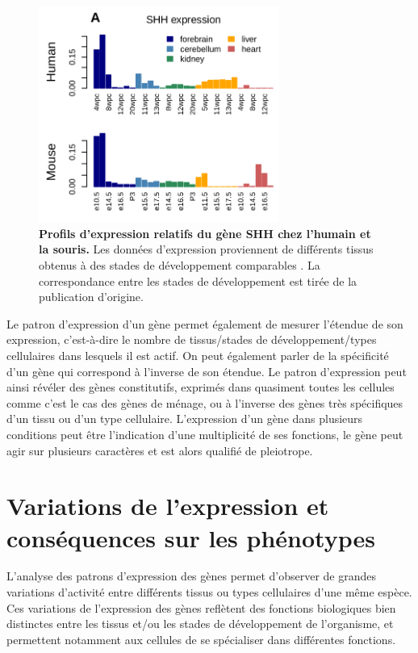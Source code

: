 \begin{figure}[h]
 \centering
 \includegraphics[width=0.7\textwidth, page=1] {figures/introduction/fig2.png}
 \caption[Profils d'expression relatifs du gène \acrshort{SHH} chez l'humain et la souris.]{
 \textbf{Profils d'expression relatifs du gène \acrshort{SHH} chez l'humain et la souris.}
 Les données d'expression proviennent de différents tissus obtenus à des stades de développement comparables \citep{cardoso-moreira_gene_2019}. La correspondance entre les stades de développement est tirée de la publication d'origine.\\
 }
 \label{fig:Fig2}
\end{figure} 

Le patron d’expression d’un gène permet également de mesurer l’étendue de son expression, c’est-à-dire le nombre de tissus/stades de développement/types cellulaires dans lesquels il est actif. On peut également parler de la spécificité d’un gène qui correspond à l’inverse de son étendue. Le patron d’expression peut ainsi révéler des gènes constitutifs, exprimés dans quasiment toutes les cellules comme c’est le cas des gènes de ménage, ou à l’inverse des gènes très spécifiques d’un tissu ou d'un type cellulaire. L’expression d’un gène dans plusieurs conditions peut être l’indication d’une multiplicité de ses fonctions, le gène peut agir sur plusieurs caractères et est alors qualifié de pleiotrope.

\section{Variations de l’expression et conséquences sur les phénotypes}
\label{sec:variations-et-consequence}

L’analyse des patrons d’expression des gènes permet d’observer de grandes variations d’activité entre différents tissus ou types cellulaires d’une même espèce. Ces variations de l’expression des gènes reflètent des fonctions biologiques bien distinctes entre les tissus et/ou les stades de développement de l’organisme, et permettent notamment aux cellules de se spécialiser dans différentes fonctions. \\

